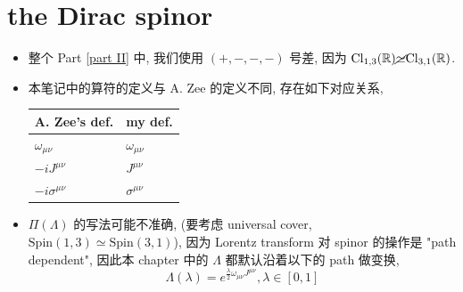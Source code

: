 \chapter{the Dirac spinor}
\begin{itemize}
	\item 整个 Part \ref{part II} 中, 我们使用 $(+, -, -, -)$ 号差, 因为 $\mathrm{Cl}_{1, 3}(\mathbb{R}) \cancel{\simeq} \mathrm{Cl}_{3, 1}(\mathbb{R})$.
	
	\item 本笔记中的算符的定义与 A. Zee 的定义不同, 存在如下对应关系,
	
	\begin{center}
		\begin{tabularx}{\linewidth}{KK}
			\toprule 
			A. Zee's def. & my def. \\
			\midrule 
			$\omega_{\mu \nu}$ & $\omega_{\mu \nu}$ \\
			$- i J^{\mu \nu}$ & $J^{\mu \nu}$ \\
			$- i \sigma^{\mu \nu}$ & $\sigma^{\mu \nu}$ \\
			\bottomrule
		\end{tabularx}
	\end{center}
	
	\item $\Pi(\Lambda)$ 的写法可能不准确, (要考虑 universal cover, $\mathrm{Spin}(1, 3) \simeq \mathrm{Spin}(3, 1)$), 因为 Lorentz transform 对 spinor 的操作是 "path dependent", 因此本 chapter 中的 $\Lambda$ 都默认沿着以下的 path 做变换,
	\begin{equation}
		\Lambda(\lambda) = e^{\frac{\lambda}{2} \omega_{\mu \nu} J^{\mu \nu}}, \lambda \in [0, 1]
	\end{equation}
\end{itemize}

